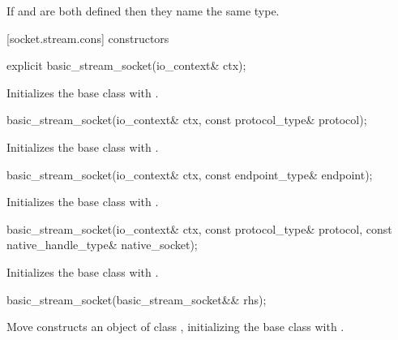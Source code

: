 \pnum
If  and 
are both defined then they name the same type.


[socket.stream.cons]{ constructors}

\begin{itemdecl}
explicit basic_stream_socket(io_context& ctx);
\end{itemdecl}

\begin{itemdescr}
\pnum
\effects Initializes the base class with .
\end{itemdescr}

\begin{itemdecl}
basic_stream_socket(io_context& ctx, const protocol_type& protocol);
\end{itemdecl}

\begin{itemdescr}
\pnum
\effects Initializes the base class with .
\end{itemdescr}

\begin{itemdecl}
basic_stream_socket(io_context& ctx, const endpoint_type& endpoint);
\end{itemdecl}

\begin{itemdescr}
\pnum
\effects Initializes the base class with .
\end{itemdescr}

\begin{itemdecl}
basic_stream_socket(io_context& ctx, const protocol_type& protocol,
                      const native_handle_type& native_socket);
\end{itemdecl}

\begin{itemdescr}
\pnum
\effects Initializes the base class with .
\end{itemdescr}

\begin{itemdecl}
basic_stream_socket(basic_stream_socket&& rhs);
\end{itemdecl}

\begin{itemdescr}
\pnum
\effects Move constructs an object of class , initializing the base class with .
\end{itemdescr}


